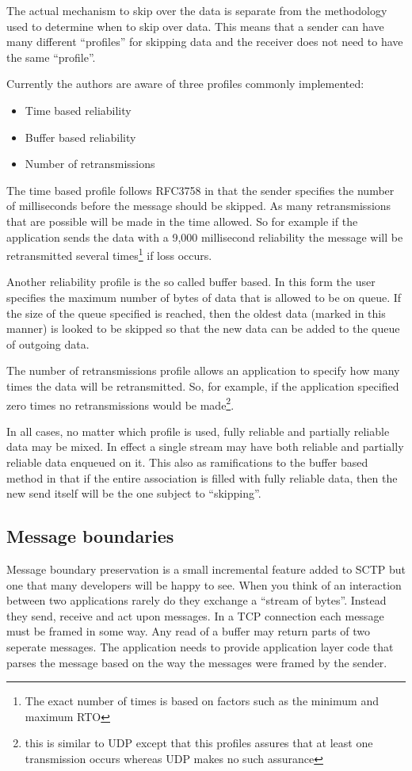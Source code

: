 \documentclass[conference]{IEEEtran}
\begin{document}
The actual mechanism to skip over the data is separate from the
methodology used to determine when to skip over data. This means that
a sender can have many different ``profiles'' for skipping data and the
receiver does not need to have the same ``profile''.

Currently the authors are aware of three profiles commonly implemented:
\begin{itemize}
  \item Time based reliability
  \item Buffer based reliability
  \item Number of retransmissions
\end{itemize}
The time based profile follows RFC3758 in that the sender specifies
the number of milliseconds before the message should be skipped.  As
many retransmissions that are possible will be made in the time allowed.
So for example if the application sends the data with a 9,000 millisecond
reliability the message will be retransmitted several times\footnote{The exact
number of times is based on factors such as the minimum and maximum RTO} if loss occurs.

Another reliability profile is the so called buffer based. In this form the user specifies the maximum
number of bytes of data that is allowed to be on queue. If the size of the queue 
specified is reached, then the oldest data (marked in this manner) is looked to be
skipped so that the new data can be added to the queue of outgoing data.

The number of retransmissions profile allows an application to specify how many
times the data will be retransmitted. So, for example, if the application specified
zero times no retransmissions would be made\footnote{this is similar to UDP
except that this profiles assures that at least one transmission occurs whereas
UDP makes no such assurance}.

In all cases, no matter which profile is used, fully reliable and partially reliable
data may be mixed. In effect a single stream may have both reliable and
partially reliable data enqueued on it. This also as ramifications to the 
buffer based method in that if the entire association is filled with 
fully reliable data, then the new send itself will be the one subject
to ``skipping''.

\subsection{Message boundaries}
\label{mbound}
Message boundary preservation is a small incremental feature added to
SCTP but one that many developers will be happy to see. When you think of
an interaction between two applications rarely do they exchange a ``stream of bytes''.
Instead they send, receive and act upon messages. In a TCP connection each
message must be framed in some way. Any read of a buffer may return
parts of two seperate messages. The application needs to provide application
layer code that parses the message based on the way the messages
were framed by the sender. 
\end{document}
